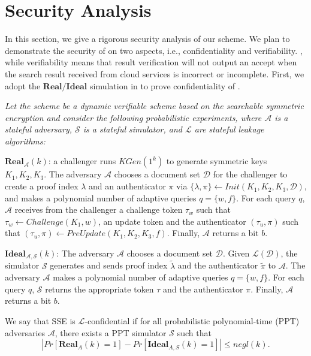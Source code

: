 \section{Security Analysis}
In this section, we give a rigorous security analysis of our \name scheme.
We plan to demonstrate the security of \name on two aspects, i.e., confidentiality and verifiability. , while verifiability means that result verification will not output an accept when the search result received from cloud services is incorrect or incomplete. First, we adopt the $\mathbf{Real/Ideal}$ simulation in \cite{kamara2011cs2} to prove confidentiality of \name.

\begin{definition}
  {\itshape
    Let the \name scheme be a dynamic verifiable scheme based on the searchable symmetric encryption and consider the following probabilistic experiments, where $\mathcal{A}$ is a stateful adversary, $\mathcal{S}$ is a stateful simulator, and $\mathcal{L}$ are stateful leakage algorithms:

    $\mathbf{Real}_\mathcal{A}(k)$: a challenger runs $KGen(1^k)$ to generate symmetric keys {$K_1,K_2,K_3$}. The adversary $\mathcal{A}$ chooses a document set $\mathcal{D}$ for the challenger to create a proof index $\lambda$ and an authenticator $\pi$ via $\{\lambda,\pi\} \leftarrow Init(K_1,K_2,K_3,\mathcal{D})$, and makes a polynomial number of adaptive queries $q = \{w,f\}$. For each query $q$, $\mathcal{A}$ receives from the challenger a challenge token $\tau_w$ such that $\tau_w \leftarrow Challenge(K_1,w)$, an update token and the authenticator $(\tau_u,\pi)$ such that $(\tau_u,\pi) \leftarrow PreUpdate(K_1,K_2,K_3,f)$. Finally, $\mathcal{A}$ returns a bit $b$.

    $\mathbf{Ideal}_\mathcal{A,S}(k)$: The adversary $\mathcal{A}$ chooses a document set $\mathcal{D}$. Given $\mathcal{L}(\mathcal{D})$, the simulator $\mathcal{S}$ generates and sends proof index $\tilde{\lambda}$ and the authenticator $\tilde{\pi}$ to $\mathcal{A}$. The adversary $\mathcal{A}$ makes a polynomial number of adaptive queries $q = \{w,f\}$. For each query $q$, $\mathcal{S}$ returns the appropriate token $\tau$ and the authenticator $\pi$. Finally, $\mathcal{A}$ returns a bit $b$.

    We say that SSE is $\mathcal{L}$-confidential if for all probabilistic polynomial-time  (PPT) adversaries $\mathcal{A}$, there exists a PPT simulator $\mathcal{S}$ such that $$|Pr[\mathbf{Real}_A(k) = 1] - Pr[\mathbf{Ideal}_{A,S}(k) = 1]| \leq negl(k).$$
  }
\end{definition}

